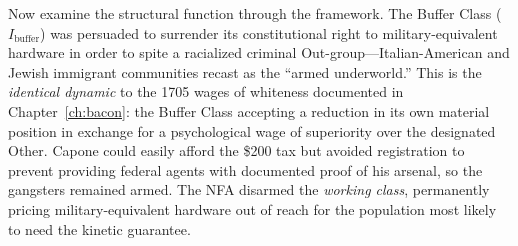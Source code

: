 Now examine the structural function through the framework. The Buffer Class ($I_{\text{buffer}}$) was persuaded to surrender its constitutional right to military-equivalent hardware in order to spite a racialized criminal Out-group---Italian-American and Jewish immigrant communities recast as the ``armed underworld.'' This is the \textit{identical dynamic} to the 1705 wages of whiteness documented in Chapter~\ref{ch:bacon}: the Buffer Class accepting a reduction in its own material position in exchange for a psychological wage of superiority over the designated Other. Capone could easily afford the \$200 tax but avoided registration to prevent providing federal agents with documented proof of his arsenal, so the gangsters remained armed. The NFA disarmed the \textit{working class}, permanently pricing military-equivalent hardware out of reach for the population most likely to need the kinetic guarantee.

